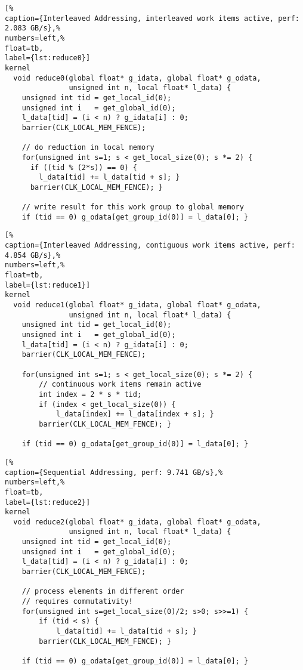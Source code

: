 \begin{lstlisting}[%                                                             
caption={Interleaved Addressing, interleaved work items active, perf: 2.083 GB/s},%
numbers=left,%
float=tb,
label={lst:reduce0}]
kernel
  void reduce0(global float* g_idata, global float* g_odata,
               unsigned int n, local float* l_data) {
    unsigned int tid = get_local_id(0);
    unsigned int i   = get_global_id(0);
    l_data[tid] = (i < n) ? g_idata[i] : 0;
    barrier(CLK_LOCAL_MEM_FENCE);

    // do reduction in local memory
    for(unsigned int s=1; s < get_local_size(0); s *= 2) {
      if ((tid % (2*s)) == 0) {
        l_data[tid] += l_data[tid + s]; }
      barrier(CLK_LOCAL_MEM_FENCE); }

    // write result for this work group to global memory
    if (tid == 0) g_odata[get_group_id(0)] = l_data[0]; }
\end{lstlisting}

\begin{lstlisting}[%                                                             
caption={Interleaved Addressing, contiguous work items active, perf: 4.854 GB/s},%
numbers=left,%
float=tb,
label={lst:reduce1}]
kernel
  void reduce1(global float* g_idata, global float* g_odata,
               unsigned int n, local float* l_data) {
    unsigned int tid = get_local_id(0);
    unsigned int i   = get_global_id(0);
    l_data[tid] = (i < n) ? g_idata[i] : 0;
    barrier(CLK_LOCAL_MEM_FENCE);

    for(unsigned int s=1; s < get_local_size(0); s *= 2) {
        // continuous work items remain active
        int index = 2 * s * tid;
        if (index < get_local_size(0)) {
            l_data[index] += l_data[index + s]; }
        barrier(CLK_LOCAL_MEM_FENCE); }

    if (tid == 0) g_odata[get_group_id(0)] = l_data[0]; }
\end{lstlisting}

\begin{lstlisting}[%                                                             
caption={Sequential Addressing, perf: 9.741 GB/s},%
numbers=left,%
float=tb,
label={lst:reduce2}]
kernel
  void reduce2(global float* g_idata, global float* g_odata,
               unsigned int n, local float* l_data) {
    unsigned int tid = get_local_id(0);
    unsigned int i   = get_global_id(0);
    l_data[tid] = (i < n) ? g_idata[i] : 0;
    barrier(CLK_LOCAL_MEM_FENCE);

    // process elements in different order
    // requires commutativity!
    for(unsigned int s=get_local_size(0)/2; s>0; s>>=1) {
        if (tid < s) {
            l_data[tid] += l_data[tid + s]; }
        barrier(CLK_LOCAL_MEM_FENCE); }

    if (tid == 0) g_odata[get_group_id(0)] = l_data[0]; }
\end{lstlisting}

